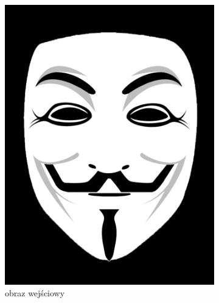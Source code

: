 \documentclass[a4paper, 12pt, polish, twoside]{extreport}
\begin{document}
\begin{figure}[H]
\begin{subfigure}{0.24\textwidth}
        \includegraphics[width = \textwidth]{img/6-comp/fawkes_original_c20_inv0.png}
        \caption{obraz wejściowy}
        \label{comp-comp-dali-turing-fawkes-i}
    \end{subfigure}
    \begin{subfigure}{0.24\textwidth}
        \centering

\end{subfigure}
\end{figure}
\end{document}
